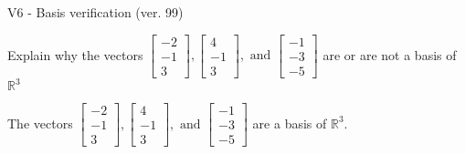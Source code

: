 \begin{exercise}
  \begin{exerciseTitle}V6 - Basis verification (ver. 99)\end{exerciseTitle}
  \begin{exerciseStatement}
    Explain why the vectors \(\left[\begin{array}{r}
-2 \\
-1 \\
3
\end{array}\right] , \left[\begin{array}{r}
4 \\
-1 \\
3
\end{array}\right] , \text{ and } \left[\begin{array}{r}
-1 \\
-3 \\
-5
\end{array}\right]\) are or are not a basis of \(\mathbb{R}^3\)	


  \end{exerciseStatement}
  \begin{exerciseAnswer}
   The vectors \(\left[\begin{array}{r}
-2 \\
-1 \\
3
\end{array}\right] , \left[\begin{array}{r}
4 \\
-1 \\
3
\end{array}\right] , \text{ and } \left[\begin{array}{r}
-1 \\
-3 \\
-5
\end{array}\right]\) 
  	 are  a basis of \(\mathbb{R}^3\).
  


  \end{exerciseAnswer}
\end{exercise}